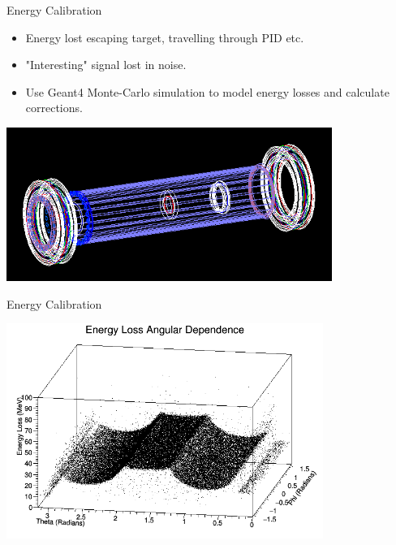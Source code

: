 \documentclass{beamer}
\begin{document}
\begin{frame}{Energy Calibration}

\begin{itemize}
    \item Energy lost escaping target, travelling through PID etc.
    \item "Interesting" signal lost in noise.
    \item Use Geant4 Monte-Carlo simulation to model energy losses and calculate corrections.
\end{itemize}

    \centering
    \includegraphics[height= 5cm]{AllIn}

\end{frame}

\begin{frame}{Energy Calibration}

\centering
\includegraphics[height = 7cm]{3DCarbon100k}

\end{frame}
\end{document}
